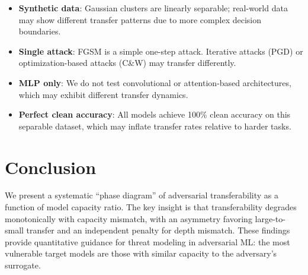 \documentclass[11pt,a4paper]{article}
\begin{document}
\begin{itemize}
  \item \textbf{Synthetic data}: Gaussian clusters are linearly separable; real-world data may show different transfer patterns due to more complex decision boundaries.
  \item \textbf{Single attack}: FGSM is a simple one-step attack. Iterative attacks (PGD) or optimization-based attacks (C\&W) may transfer differently.
  \item \textbf{MLP only}: We do not test convolutional or attention-based architectures, which may exhibit different transfer dynamics.
  \item \textbf{Perfect clean accuracy}: All models achieve 100\% clean accuracy on this separable dataset, which may inflate transfer rates relative to harder tasks.
\end{itemize}

\section{Conclusion}

We present a systematic ``phase diagram'' of adversarial transferability as a function of model capacity ratio. The key insight is that transferability degrades monotonically with capacity mismatch, with an asymmetry favoring large-to-small transfer and an independent penalty for depth mismatch. These findings provide quantitative guidance for threat modeling in adversarial ML: the most vulnerable target models are those with similar capacity to the adversary's surrogate.
\end{document}
